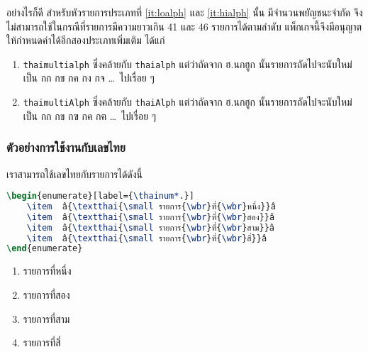 \documentclass[11pt]{ltxguide}
\renewcommand{\baselinestretch}{1.5}
\begin{document}
\medskip
อย่างไร{\wbr}ก็{\wbr}ดี สำหรับ{\wbr}หัว{\wbr}รายการ{\wbr}ประเภท{\wbr}ที่ \ref{it:loalph} และ \ref{it:hialph} นั้น มี{\wbr}จำนวน{\wbr}พยัญชนะ{\wbr}จำกัด จึง{\wbr}ไม่{\wbr}สามารถ{\wbr}ใช้{\wbr}ใน{\wbr}กรณี{\wbr}ที่{\wbr}รายการ{\wbr}มี{\wbr}ความ{\wbr}ยาว{\wbr}เกิน 41 และ 46 รายการ{\wbr}ได้{\wbr}ตาม{\wbr}ลำดับ แพ็ก{\wbr}เก{\wbr}จ{\wbr}นี้{\wbr}จึง{\wbr}มี{\wbr}อนุญาต{\wbr}ให้{\wbr}กำหนด{\wbr}ค่า{\wbr}ได้{\wbr}อีก{\wbr}สอง{\wbr}ประเภท{\wbr}เพิ่มเติม ได้แก่{\wbr}

\begin{enumerate}[topsep=0.25pc,itemsep=0pc,start=4,label={\thainum*.}]
    \item  \texttt{thaimultialph} ซึ่ง{\wbr}คล้าย{\wbr}กับ \texttt{thaialph} แต่ว่า{\wbr}ถัด{\wbr}จาก ฮ.{\wbr}นก{\wbr}ฮูก นั้น{\wbr}รายการ{\wbr}ถัด{\wbr}ไป{\wbr}จะ{\wbr}นับ{\wbr}ใหม่{\wbr}เป็น กก กข กค กง กจ \ldots\, ไป{\wbr}เรื่อย ๆ
    \item  \texttt{thaimultiAlph} ซึ่ง{\wbr}คล้าย{\wbr}กับ \texttt{thaiAlph} แต่ว่า{\wbr}ถัด{\wbr}จาก ฮ.{\wbr}นก{\wbr}ฮูก นั้น{\wbr}รายการ{\wbr}ถัด{\wbr}ไป{\wbr}จะ{\wbr}นับ{\wbr}ใหม่{\wbr}เป็น กก กข กฃ กค กฅ \ldots\, ไป{\wbr}เรื่อย ๆ
\end{enumerate}

\newpage
\subsubsection{ตัวอย่าง{\wbr}การ{\wbr}ใช้งาน{\wbr}กับ{\wbr}เลข{\wbr}ไทย}

เรา{\wbr}สามารถ{\wbr}ใช้{\wbr}เลข{\wbr}ไทย{\wbr}กับ{\wbr}รายการ{\wbr}ได้{\wbr}ดังนี้{\wbr}

\smallskip
\renewcommand{\baselinestretch}{0.1}
\begin{lstlisting}[language=LaTeX,escapechar={â},basicstyle=\ttfamily,lineskip={0.05pc}]
\begin{enumerate}[label={\thainum*.}]
    \item  â{\textthai{\small รายการ{\wbr}ที่{\wbr}หนึ่ง}}â
    \item  â{\textthai{\small รายการ{\wbr}ที่{\wbr}สอง}}â
    \item  â{\textthai{\small รายการ{\wbr}ที่{\wbr}สาม}}â
    \item  â{\textthai{\small รายการ{\wbr}ที่{\wbr}สี่}}â
\end{enumerate}
\end{lstlisting}
\renewcommand{\baselinestretch}{1.5}

\begin{enumerate}[topsep=0pc,itemsep=0pc,label={\thainum*.}]
    \item  รายการ{\wbr}ที่{\wbr}หนึ่ง{\wbr}
    \item  รายการ{\wbr}ที่{\wbr}สอง{\wbr}
    \item  รายการ{\wbr}ที่{\wbr}สาม{\wbr}
    \item  รายการ{\wbr}ที่{\wbr}สี่{\wbr}
\end{enumerate}
\end{document}
